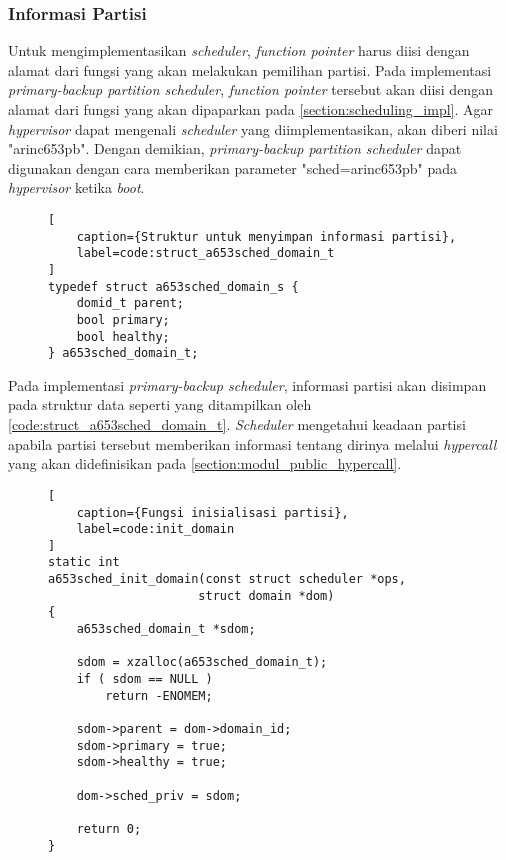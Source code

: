 \subsubsection{Informasi Partisi}
\label{section:informasi_partisi_impl}

Untuk mengimplementasikan \textit{scheduler}, \textit{function pointer} 
harus diisi dengan alamat dari fungsi yang akan melakukan pemilihan partisi. Pada implementasi
\textit{primary-backup partition scheduler}, \textit{function pointer} tersebut akan diisi
dengan alamat dari fungsi  yang akan dipaparkan pada
\autoref{section:scheduling_impl}. Agar \textit{hypervisor} dapat mengenali \textit{scheduler}
yang diimplementasikan,  akan diberi nilai "arinc653pb". Dengan demikian,
\textit{primary-backup partition scheduler} dapat digunakan dengan cara memberikan parameter
"sched=arinc653pb" pada \textit{hypervisor} ketika \textit{boot}.

\begin{figure}
\begin{lstlisting}[
	caption={Struktur untuk menyimpan informasi partisi},
	label=code:struct_a653sched_domain_t
]
typedef struct a653sched_domain_s {
    domid_t parent;
    bool primary;
    bool healthy;
} a653sched_domain_t;
\end{lstlisting}
\end{figure}

Pada implementasi \textit{primary-backup scheduler}, informasi partisi akan disimpan pada
struktur data seperti yang ditampilkan oleh \autoref{code:struct_a653sched_domain_t}.
\textit{Scheduler} mengetahui keadaan partisi apabila partisi tersebut memberikan informasi
tentang dirinya melalui \textit{hypercall} yang akan didefinisikan pada
\autoref{section:modul_public_hypercall}.

\begin{figure}
\begin{lstlisting}[
	caption={Fungsi inisialisasi partisi},
	label=code:init_domain
]
static int
a653sched_init_domain(const struct scheduler *ops,
                     struct domain *dom)
{
    a653sched_domain_t *sdom;

    sdom = xzalloc(a653sched_domain_t);
    if ( sdom == NULL )
        return -ENOMEM;

    sdom->parent = dom->domain_id;
    sdom->primary = true;
    sdom->healthy = true;

    dom->sched_priv = sdom;

    return 0;
}
\end{lstlisting}
\end{figure}

